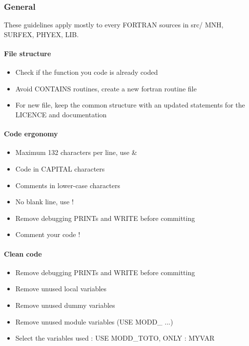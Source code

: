 \subsubsection{General}
These guidelines apply mostly to every FORTRAN sources in src/ MNH, SURFEX, PHYEX, LIB.

\paragraph{File structure}
\begin{itemize}
    \item Check if the function you code is already coded
    \item Avoid CONTAINS routines, create a new fortran routine file
    \item For new file, keep the common structure with an updated statements for the LICENCE and documentation
\end{itemize}

\paragraph{Code ergonomy}
\begin{itemize}
    \item Maximum 132 characters per line, use \&
    \item Code in CAPITAL characters
    \item Comments in lower-case characters
    \item No blank line, use !
    \item Remove debugging PRINTs and WRITE before committing
    \item Comment your code !
\end{itemize}

\paragraph{Clean code}
\begin{itemize}
    \item Remove debugging PRINTs and WRITE before committing
    \item Remove unused local variables
    \item Remove unused dummy variables
    \item Remove unused module variables (USE MODD\_ ...)
    \item Select the variables used : USE MODD\_TOTO, ONLY : MYVAR
\end{itemize}

